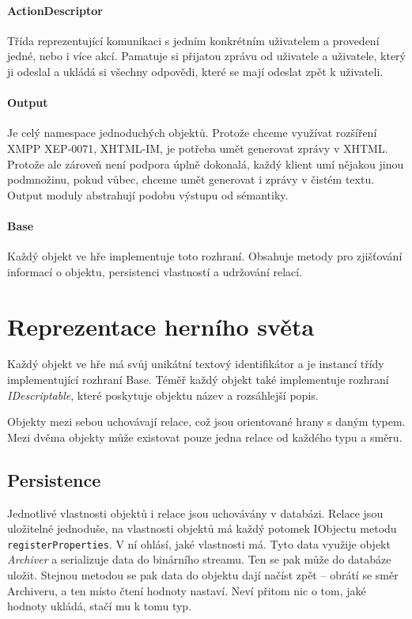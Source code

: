 \documentclass[11pt, a4paper]{article}
\def\class#1{\emph{#1}}
\begin{document}
\paragraph{ActionDescriptor} Třída reprezentující komunikaci s jedním konkrétním uživatelem a provedení jedné, nebo i více akcí. Pamatuje si přijatou zprávu od uživatele a uživatele, který ji odeslal a ukládá si všechny odpovědi, které se mají odeslat zpět k uživateli.

\paragraph{Output} Je celý namespace jednoduchých objektů. Protože chceme využívat rozšíření XMPP XEP-0071, XHTML-IM, je potřeba umět generovat zprávy v XHTML. Protože ale zároveň není podpora úplně dokonalá, každý klient umí nějakou jinou podmnožinu, pokud vůbec, chceme umět generovat i zprávy v čistém textu. Output moduly abstrahují podobu výstupu od sémantiky.

\paragraph{Base} Každý objekt ve hře implementuje toto rozhraní. Obsahuje metody pro zjišťování informací o objektu, persistenci vlastností a udržování relací.

\section{Reprezentace herního světa}

Každý objekt ve hře má svůj unikátní textový identifikátor a je instancí třídy implementující rozhraní Base. Téměř každý objekt také implementuje rozhraní \class{IDescriptable}, které poskytuje objektu název a rozsáhlejší popis. 

Objekty mezi sebou uchovávají relace, což jsou orientované hrany s daným typem. Mezi dvěma objekty může existovat pouze jedna relace od každého typu a směru.

\subsection{Persistence}

Jednotlivé vlastnosti objektů i relace jsou uchovávány v databázi. Relace jsou uložitelné jednoduše, na vlastnosti objektů má každý potomek IObjectu metodu \texttt{registerProperties}. V ní ohlásí, jaké vlastnosti má. Tyto data využije objekt \class{Archiver} a serializuje data do binárního streamu. Ten se pak může do databáze uložit. Stejnou metodou se pak data do objektu dají načíst zpět -- obrátí se směr Archiveru, a ten místo čtení hodnoty nastaví. Neví přitom nic o tom, jaké hodnoty ukládá, stačí mu k tomu typ.
\end{document}
